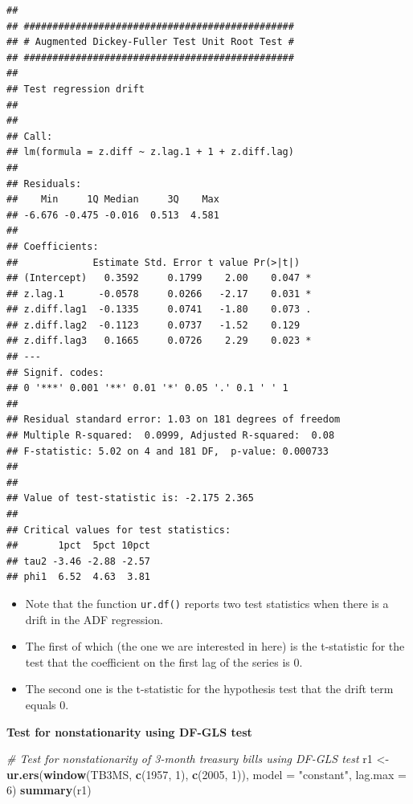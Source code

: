 \documentclass[]{book}
\newenvironment{Shaded}{\begin{snugshade}}{\end{snugshade}}
\newcommand{\CommentTok}[1]{\textcolor[rgb]{0.56,0.35,0.01}{\textit{#1}}}
\newcommand{\DataTypeTok}[1]{\textcolor[rgb]{0.13,0.29,0.53}{#1}}
\newcommand{\DecValTok}[1]{\textcolor[rgb]{0.00,0.00,0.81}{#1}}
\newcommand{\KeywordTok}[1]{\textcolor[rgb]{0.13,0.29,0.53}{\textbf{#1}}}
\newcommand{\NormalTok}[1]{#1}
\newcommand{\StringTok}[1]{\textcolor[rgb]{0.31,0.60,0.02}{#1}}
\providecommand{\tightlist}{%
  \setlength{\itemsep}{0pt}\setlength{\parskip}{0pt}}
\begin{document}
\begin{verbatim}
## 
## ############################################### 
## # Augmented Dickey-Fuller Test Unit Root Test # 
## ############################################### 
## 
## Test regression drift 
## 
## 
## Call:
## lm(formula = z.diff ~ z.lag.1 + 1 + z.diff.lag)
## 
## Residuals:
##    Min     1Q Median     3Q    Max 
## -6.676 -0.475 -0.016  0.513  4.581 
## 
## Coefficients:
##             Estimate Std. Error t value Pr(>|t|)  
## (Intercept)   0.3592     0.1799    2.00    0.047 *
## z.lag.1      -0.0578     0.0266   -2.17    0.031 *
## z.diff.lag1  -0.1335     0.0741   -1.80    0.073 .
## z.diff.lag2  -0.1123     0.0737   -1.52    0.129  
## z.diff.lag3   0.1665     0.0726    2.29    0.023 *
## ---
## Signif. codes:  
## 0 '***' 0.001 '**' 0.01 '*' 0.05 '.' 0.1 ' ' 1
## 
## Residual standard error: 1.03 on 181 degrees of freedom
## Multiple R-squared:  0.0999, Adjusted R-squared:  0.08 
## F-statistic: 5.02 on 4 and 181 DF,  p-value: 0.000733
## 
## 
## Value of test-statistic is: -2.175 2.365 
## 
## Critical values for test statistics: 
##       1pct  5pct 10pct
## tau2 -3.46 -2.88 -2.57
## phi1  6.52  4.63  3.81
\end{verbatim}

\begin{itemize}
\tightlist
\item
  Note that the function \texttt{ur.df()} reports two test statistics when there is a drift in the ADF regression.
\item
  The first of which (the one we are interested in here) is the t-statistic for the test that the coefficient on the first lag of the series is 0.
\item
  The second one is the t-statistic for the hypothesis test that the drift term equals 0.
\end{itemize}

\textbf{Test for nonstationarity using DF-GLS test}

\begin{Shaded}
\begin{Highlighting}[]
\CommentTok{# Test for nonstationarity of 3-month treasury bills using DF-GLS test}
\NormalTok{r1 <-}\StringTok{ }\KeywordTok{ur.ers}\NormalTok{(}\KeywordTok{window}\NormalTok{(TB3MS, }\KeywordTok{c}\NormalTok{(}\DecValTok{1957}\NormalTok{, }\DecValTok{1}\NormalTok{), }\KeywordTok{c}\NormalTok{(}\DecValTok{2005}\NormalTok{, }\DecValTok{1}\NormalTok{)),}
             \DataTypeTok{model =} \StringTok{"constant"}\NormalTok{, }
             \DataTypeTok{lag.max =} \DecValTok{6}\NormalTok{)}
\KeywordTok{summary}\NormalTok{(r1)}
\end{Highlighting}
\end{Shaded}
\end{document}
